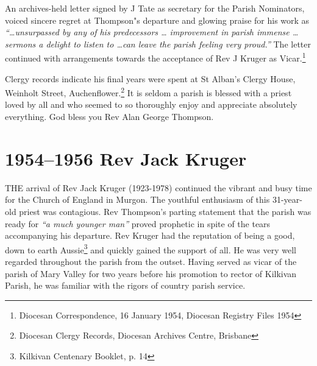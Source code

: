 An archives-held letter signed by J Tate as secretary for the Parish Nominators, voiced sincere regret at Thompson"s departure and glowing praise for his work as \emph{``\ldots unsurpassed by any of his predecessors \ldots{} improvement in parish immense \ldots{} sermons a delight to listen to \ldots can leave the parish feeling very proud.''} The letter continued with arrangements towards the acceptance of Rev J Kruger as Vicar.\footnote{Diocesan Correspondence, 16 January 1954, Diocesan Registry Files 1954}


Clergy records indicate his final years were spent at St Alban's Clergy House, Weinholt Street, Auchenflower.\footnote{Diocesan Clergy Records, Diocesan Archives Centre, Brisbane} It is seldom a parish is blessed with a priest loved by all and who seemed to so thoroughly enjoy and appreciate absolutely everything. God bless you Rev Alan George Thompson.


\balance


\printendnotes[custom]
\setcounter{endnote}{0}
\chapter{1954--1956 Rev Jack Kruger}
\nobalance


\lettrine[lines=3]{T}{HE}
 arrival of Rev Jack Kruger (1923-1978) continued the vibrant and busy time for the Church of England in Murgon. The youthful enthusiasm of this 31-year-old priest was contagious. Rev Thompson's parting statement that the parish was ready for \emph{``a much younger man''} proved prophetic in spite of the tears accompanying his departure. Rev Kruger had the reputation of being a good, down to earth Aussie\footnote{Kilkivan Centenary Booklet, p. 14} and quickly gained the support of all. He was very well regarded throughout the parish from the outset. Having served as vicar of the parish of Mary Valley for two years before his promotion to rector of Kilkivan Parish, he was familiar with the rigors of country parish service.

